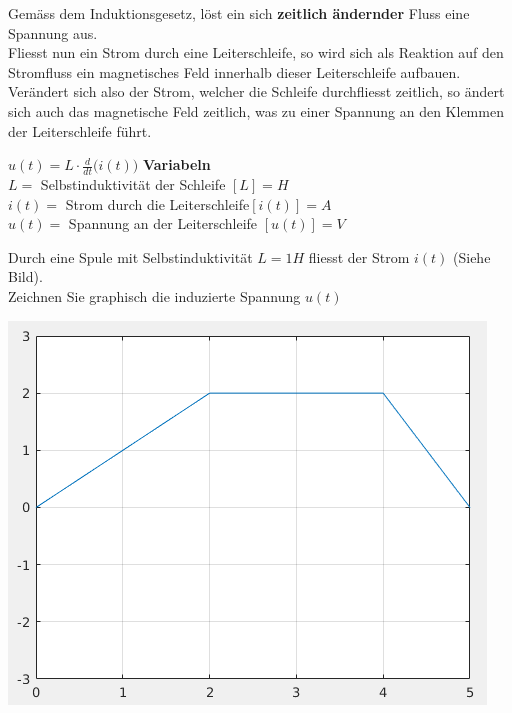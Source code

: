 \newpage



Gemäss dem Induktionsgesetz, löst ein sich \textbf{zeitlich ändernder} Fluss eine Spannung aus. \\
Fliesst nun ein Strom durch eine Leiterschleife, so wird sich als Reaktion auf den Stromfluss ein magnetisches Feld innerhalb dieser Leiterschleife aufbauen.  \\
Verändert sich also der Strom, welcher die Schleife durchfliesst zeitlich, so ändert sich auch das magnetische Feld zeitlich, was zu einer Spannung an den Klemmen der Leiterschleife führt.

\begingl
\begin{center}

	\fspace

\end{center}


\formulaBegin
$u(t) = L \cdot \frac{d}{dt}\big( i(t) \big) $
\formulaEnd
\textbf{Variabeln} \\
$L =$ Selbstinduktivität der Schleife $ [L] = H$ \\
$i(t) =$ Strom durch die Leiterschleife$ [i(t)] = A$ \\
$u(t) = $ Spannung an der Leiterschleife $[u(t)] = V$
\iend

\beginbsp
Durch eine Spule mit Selbstinduktivität $L = 1 H$ fliesst der Strom $i(t)$ (Siehe Bild). \\
Zeichnen Sie graphisch die induzierte Spannung $u(t)$
\begin{center}
	\includegraphics[scale=0.5]{img/selbstind-a1}
\end{center}

